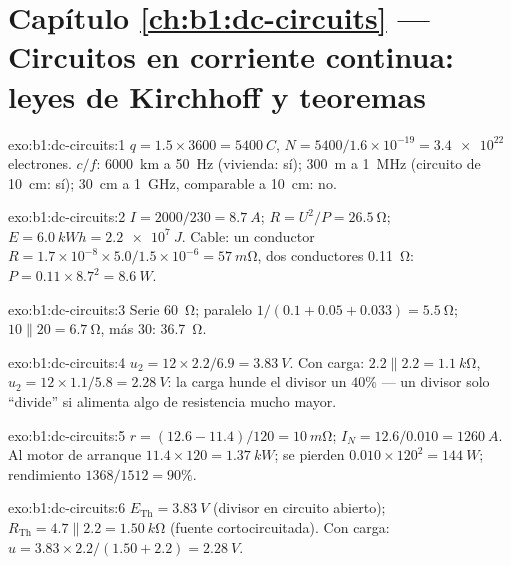 \section*{Capítulo \ref{ch:b1:dc-circuits} --- Circuitos en corriente continua: leyes de Kirchhoff y teoremas}

\begin{solution}{exo:b1:dc-circuits:1}
$q = 1.5 \times 3600 = \qty{5400}{C}$, $N = 5400/1.6\times10^{-19} =
\num{3.4e22}$ electrones. $c/f$: \qty{6000}{km} a \qty{50}{Hz} (vivienda:
sí); \qty{300}{m} a \qty{1}{MHz} (circuito de \qty{10}{cm}: sí);
\qty{30}{cm} a \qty{1}{GHz}, comparable a \qty{10}{cm}: no.
\end{solution}

\begin{solution}{exo:b1:dc-circuits:2}
$I = 2000/230 = \qty{8.7}{A}$; $R = U^2/P = \qty{26.5}{\ohm}$; $E =
\qty{6.0}{kWh} = \qty{2.2e7}{J}$. Cable: un conductor $R = 1.7\times10^{-8}
\times 5.0/1.5\times10^{-6} = \qty{57}{m\ohm}$, dos conductores
\qty{0.11}{\ohm}: $P = 0.11 \times 8.7^2 = \qty{8.6}{W}$.
\end{solution}

\begin{solution}{exo:b1:dc-circuits:3}
Serie \qty{60}{\ohm}; paralelo $1/(0.1 + 0.05 + 0.033) = \qty{5.5}{\ohm}$;
$10 \parallel 20 = \qty{6.7}{\ohm}$, más $30$: \qty{36.7}{\ohm}.
\end{solution}

\begin{solution}{exo:b1:dc-circuits:4}
$u_2 = 12 \times 2.2/6.9 = \qty{3.83}{V}$. Con carga: $2.2 \parallel 2.2 =
\qty{1.1}{k\ohm}$, $u_2 = 12 \times 1.1/5.8 = \qty{2.28}{V}$: la carga
hunde el divisor un $40\%$ --- un divisor solo ``divide'' si alimenta algo
de resistencia mucho mayor.
\end{solution}

\begin{solution}{exo:b1:dc-circuits:5}
$r = (12.6 - 11.4)/120 = \qty{10}{m\ohm}$; $I_N = 12.6/0.010 =
\qty{1260}{A}$. Al motor de arranque $11.4 \times 120 = \qty{1.37}{kW}$; se
pierden $0.010 \times 120^2 = \qty{144}{W}$; rendimiento $1368/1512 = 90\%$.
\end{solution}

\begin{solution}{exo:b1:dc-circuits:6}
$E_{\mathrm{Th}} = \qty{3.83}{V}$ (divisor en circuito abierto); $R_{\mathrm{Th}}
= 4.7 \parallel 2.2 = \qty{1.50}{k\ohm}$ (fuente cortocircuitada). Con carga:
$u = 3.83 \times 2.2/(1.50 + 2.2) = \qty{2.28}{V}$.
\end{solution}


